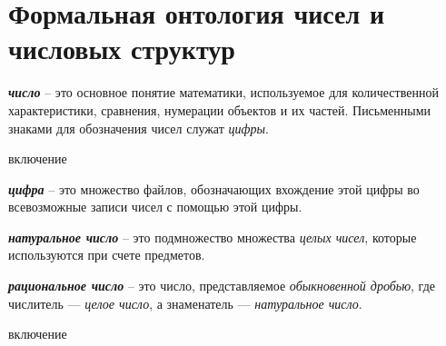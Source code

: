 \section{Формальная онтология чисел и числовых структур}
\label{sec_top_ontologies_numbers}

\textbf{\textit{число}} -- это основное понятие математики, используемое для количественной характеристики, сравнения, нумерации объектов и их частей. Письменными знаками для обозначения чисел служат \textit{цифры}.

\begin{SCn}
	
\end{SCn}

\begin{SCn}

\begin{scnrelfromlist}{включение}
\end{scnrelfromlist}
\end{SCn}

\textbf{\textit{цифра}} -- это множество файлов, обозначающих вхождение этой цифры во всевозможные записи чисел с помощью этой цифры.

\begin{SCn}
\end{SCn}

\textbf{\textit{натуральное число}} -- это подмножество множества \textit{целых чисел}, которые используются при счете предметов.


\begin{SCn}
\end{SCn}

\textbf{\textit{рациональное число}} -- это число, представляемое \textit{обыкновенной дробью}, где числитель — \textit{целое число}, а знаменатель — \textit{натуральное число}.

\begin{SCn}
\begin{scnrelfromlist}{включение}
\end{scnrelfromlist}
\end{SCn}

